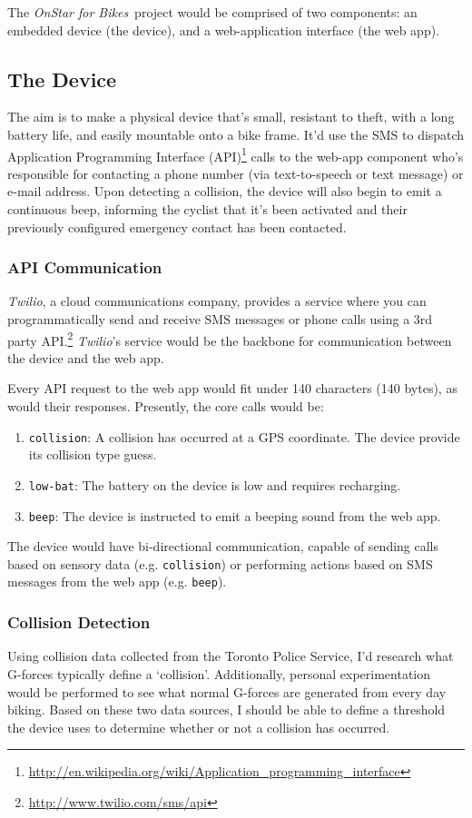 \documentclass[titlepage]{article}
\newcommand{\onstar}{{\em OnStar for Bikes}}
\begin{document}
The \onstar\ project would be comprised of two components: an embedded device (the device), and a web-application interface (the web app).

\subsection{The Device}
The aim is to make a physical device that's small, resistant to theft, with a long battery life, and easily mountable onto a bike frame. It'd use the SMS to dispatch Application Programming Interface (API)\footnote{\url{http://en.wikipedia.org/wiki/Application_programming_interface}} calls to the web-app component who's responsible for contacting a phone number (via text-to-speech or text message) or e-mail address. Upon detecting a collision, the device will also begin to emit a continuous beep, informing the cyclist that it's been activated and their previously configured emergency contact has been contacted.

\subsubsection{API Communication}
{\em Twilio}, a cloud communications company, provides a service where you can programmatically send and receive SMS messages or phone calls using a 3rd party API.\footnote{\url{http://www.twilio.com/sms/api}} {\em Twilio}'s service would be the backbone for communication between the device and the web app.

Every API request to the web app would fit under 140 characters (140 bytes), as would their responses. Presently, the core calls would be:

\begin{enumerate}
	\item {\tt collision}: A collision has occurred at a GPS coordinate. The device provide its collision type guess.
	\item {\tt low-bat}: The battery on the device is low and requires recharging.
	\item {\tt beep}: The device is instructed to emit a beeping sound from the web app.
\end{enumerate}

The device would have bi-directional communication, capable of sending calls based on sensory data (e.g. {\tt collision}) or performing actions based on SMS messages from the web app (e.g. {\tt beep}).

\subsubsection{Collision Detection}
Using collision data collected from the Toronto Police Service, I'd research what G-forces typically define a `collision'. Additionally, personal experimentation would be performed to see what normal G-forces are generated from every day biking. Based on these two data sources, I should be able to define a threshold the device uses to determine whether or not a collision has occurred.
\end{document}
